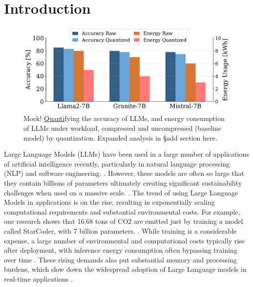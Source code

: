 \section{Introduction}


\begin{figure}[H]
    \centering
    \includegraphics[width=0.95\linewidth]{reportTemplate/figures/f1.pdf}
    \caption{Mock! \underline{Quanti}fying the accuracy of LLMs, and energy consumption of LLMs under workload, compressed and uncompressed (baseline model) by quantization. Expanded analysis in §add section here.}
    \label{fig:f1}
    
\end{figure}
Large Language Models (LLMs) have been used in a large number of applications of artificial intelligence recently, particularly in natural language processing (NLP) and software engineering. \cite{DBLP:journals/corr/abs-1910-01108} \cite{10968787}. However, these models are often so large that they contain billions of parameters ultimately creating significant sustainability challenges when used on a massive scale. \cite{DBLP:journals/tacl/ZhuLLMW24} \cite{DBLP:journals/corr/abs-1910-01108}. The trend of using Large Language Models in applications is on the rise, resulting in exponentially scaling computational requirements and substantial environmental costs. For example, one research shows that 16.68 tons of CO2 are emitted just by training a model called StarCoder, with 7 billion parameters. \cite{DBLP:journals/corr/abs-2507-09665}. While training is a considerable expense, a large number of environmental and computational costs typically rise after deployment, with inference energy consumption often bypassing training over time \cite{DBLP:journals/corr/abs-2507-09665}. These rising demands also put substantial memory and processing burdens, which slow down the widespread adoption of Large Language models in real-time applications \cite{DBLP:journals/corr/abs-1910-01108}.




